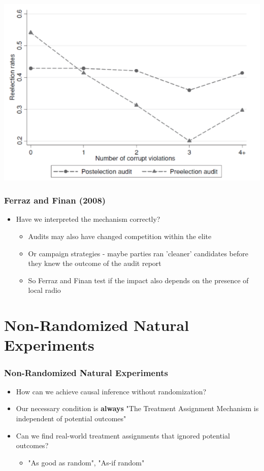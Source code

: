 \documentclass[xcolor=x11names,compress]{beamer}\usepackage[]{graphicx}\usepackage[]{color}
\renewcommand{\(}{\begin{columns}}
\renewcommand{\)}{\end{columns}}
\newcommand{\<}[1]{\begin{column}{#1}}
\renewcommand{\>}{\end{column}}
\begin{document}
\begin{frame}
\begin{center}
\includegraphics[scale=0.45]{Chart_FF.png}
\end{center}
\end{frame}

\begin{frame}
\frametitle{Ferraz and Finan (2008)}
\begin{itemize}
\item Have we interpreted the mechanism correctly?
\pause
\begin{itemize}
\item Audits may also have changed competition within the elite
\pause
\item Or campaign strategies - maybe parties ran 'cleaner' candidates before they knew the outcome of the audit report
\pause
\item So Ferraz and Finan test if the impact also depends on the presence of local radio
\end{itemize}
\end{itemize}
\end{frame}

\section{Non-Randomized Natural Experiments}

\begin{frame}
\frametitle{Non-Randomized Natural Experiments}
\begin{itemize}
\item How can we achieve causal inference without randomization?
\pause
\item Our necessary condition is \textbf{always} "The Treatment Assignment Mechanism is independent of potential outcomes"
\pause
\item Can we find real-world treatment assignments that ignored potential outcomes?
\begin{itemize}
\pause
\item "As good as random", "As-if random"
\end{itemize}
\end{itemize}
\end{frame}
\end{document}
